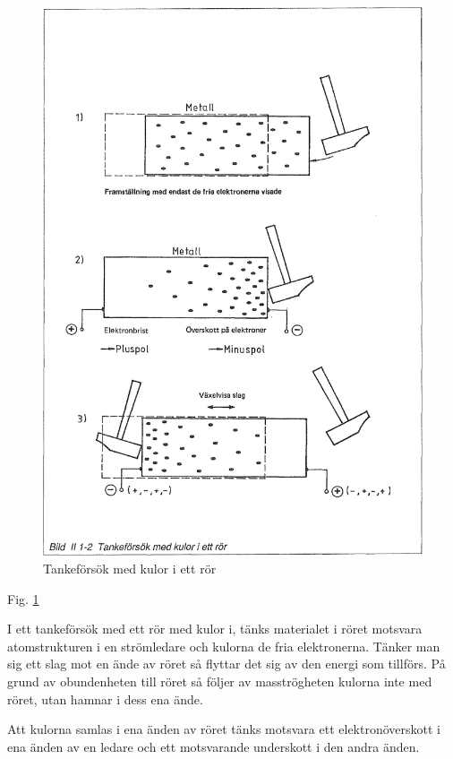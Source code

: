 \begin{figure}
\begin{center}
\includegraphics[width=14cm]{images/bild_2_1-02}
\caption{Tankeförsök med kulor i ett rör}
\label{fig:BildII1-2}
\end{center}
\end{figure}

Fig. \ref{fig:BildII1-2}

I ett tankeförsök med ett rör med kulor i, tänks materialet i röret motsvara
atomstrukturen i en strömledare och kulorna de fria elektronerna. Tänker man
sig ett slag mot en ände av röret så flyttar det sig av den energi som
tillförs. På grund av obundenheten till röret så följer av masströgheten
kulorna inte med röret, utan hamnar i dess ena ände.

Att kulorna samlas i ena änden av röret tänks motsvara ett elektronöverskott i
ena änden av en ledare och ett motsvarande underskott i den andra änden.

